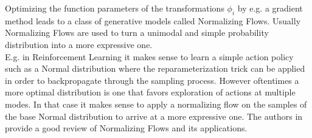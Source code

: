\documentclass{article}
\begin{document}
Optimizing the function parameters of the transformations $\phi_i$ by e.g. a gradient method leads to a class of generative models called Normalizing Flows. Usually Normalizing Flows are used to turn a unimodal and simple probability distribution into a more expressive one.\\
E.g. in Reinforcement Learning it makes sense to learn a simple action policy such as a Normal distribution where the reparameterization trick can be applied in order to backpropagate through the sampling process. However oftentimes a more optimal distribution is one that favors exploration of actions at multiple modes. In that case it makes sense to apply a normalizing flow on the samples of the base Normal distribution to arrive at a more expressive one. The authors in \cite{Kobyzev_2020} provide a good review of Normalizing Flows and its applications.
\end{document}
